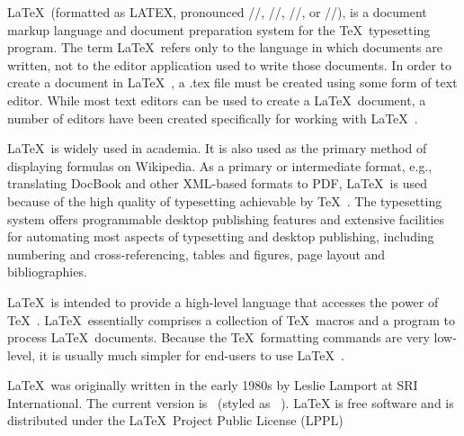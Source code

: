 
\LaTeX\ (formatted as LATEX, pronounced //, //, //, or //), is a document markup language and document preparation system for the \TeX\ typesetting program. The term \LaTeX\ refers only to the language in which documents are written, not to the editor application used to write those documents. In order to create a document in \LaTeX\ , a .tex file must be created using some form of text editor. While most text editors can be used to create a \LaTeX\ document, a number of editors have been created specifically for working with \LaTeX\ .

\LaTeX\ is widely used in academia. It is also used as the primary method of displaying formulas on Wikipedia. As a primary or intermediate format, e.g., translating DocBook and other XML-based formats to PDF, \LaTeX\ is used because of the high quality of typesetting achievable by \TeX\ . The typesetting system offers programmable desktop publishing features and extensive facilities for automating most aspects of typesetting and desktop publishing, including numbering and cross-referencing, tables and figures, page layout and bibliographies.

\LaTeX\ is intended to provide a high-level language that accesses the power of \TeX\ . \LaTeX\ essentially comprises a collection of \TeX\ macros and a program to process \LaTeX\ documents. Because the \TeX\ formatting commands are very low-level, it is usually much simpler for end-users to use \LaTeX\ .

\LaTeX\ was originally written in the early 1980s by Leslie Lamport at SRI International. The current version is \LaTeXe\ (styled as \LaTeXe\ ). LaTeX is free software and is distributed under the \LaTeX\ Project Public License (LPPL)

\newcommand{\keywords}{\LaTeX}
